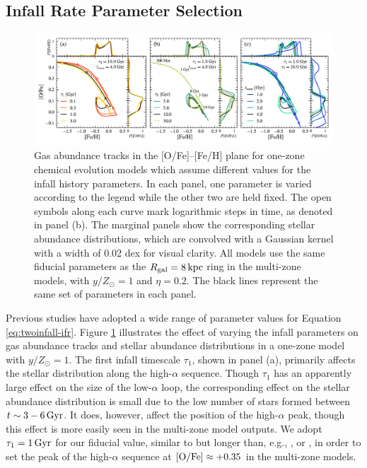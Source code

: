 \documentclass[twocolumn,twocolappendix,linenumbers]{aastex631}
\newcommand{\mathOFe}{{\rm [O/Fe]}}
\newcommand{\yZ}[1]{$y/Z_\odot=#1$}
\newcommand{\kpc}{\,{\rm kpc}}
\begin{document}
\subsection{Infall Rate Parameter Selection}
\label{sec:parameter-selection}

\begin{figure}
    \centering
    \includegraphics[width=\textwidth]{figures/infall_parameters.pdf}
    \caption{Gas abundance tracks in the [O/Fe]--[Fe/H] plane for one-zone chemical evolution models which assume different values for the infall history parameters. In each panel, one parameter is varied according to the legend while the other two are held fixed. The open symbols along each curve mark logarithmic steps in time, as denoted in panel (b). The marginal panels show the corresponding stellar abundance distributions, which are convolved with a Gaussian kernel with a width of 0.02 dex for visual clarity. All models use the same fiducial parameters as the $R_{\rm gal}=8\kpc$ ring in the multi-zone models, with \yZ{1} and $\eta=0.2$. The black lines represent the same set of parameters in each panel.}
    \label{fig:twoinfall-parameters}
\end{figure}

Previous studies have adopted a wide range of parameter values for Equation \ref{eq:twoinfall-ifr}. Figure \ref{fig:twoinfall-parameters} illustrates the effect of varying the infall parameters on gas abundance tracks and stellar abundance distributions in a one-zone model with \yZ{1}. The first infall timescale $\tau_1$, shown in panel (a), primarily affects the stellar distribution along the high-$\alpha$ sequence. Though $\tau_1$ has an apparently large effect on the size of the low-$\alpha$ loop, the corresponding effect on the stellar abundance distribution is small due to the low number of stars formed between $t\sim3-6\,{\rm Gyr}$. It does, however, affect the position of the high-$\alpha$ peak, though this effect is more easily seen in the multi-zone model outputs. We adopt $\tau_1=1\,{\rm Gyr}$ for our fiducial value, similar to \citet{spitoni_galactic_2020} but longer than, e.g., \citet{nissen_high-precision_2020}, \citet{spitoni_apogee_2021} or \citet{hegedus_reconstructing_2025}, in order to set the peak of the high-$\alpha$ sequence at $\mathOFe\approx+0.35$ in the multi-zone models. 
\end{document}
